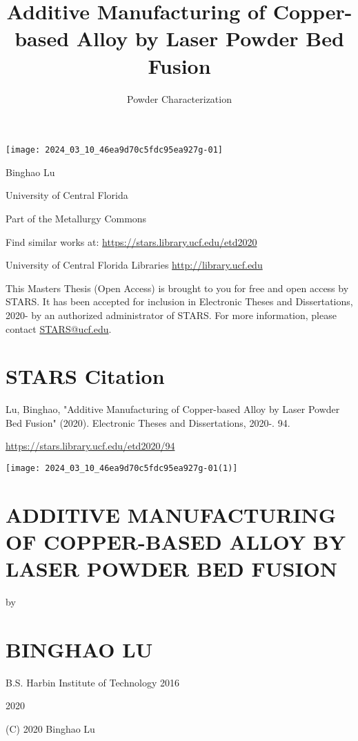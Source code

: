 \documentclass[10pt]{article}
\title{Additive Manufacturing of Copper-based Alloy by Laser Powder Bed Fusion }
\author{Powder Characterization}
\date{}
\begin{document}
\maketitle
\begin{center}
\texttt{[image: 2024\_03\_10\_46ea9d70c5fdc95ea927g-01]}
\end{center}

Binghao Lu

University of Central Florida

Part of the Metallurgy Commons

Find similar works at: \href{https://stars.library.ucf.edu/etd2020}{https://stars.library.ucf.edu/etd2020}

University of Central Florida Libraries \href{http://library.ucf.edu}{http://library.ucf.edu}

This Masters Thesis (Open Access) is brought to you for free and open access by STARS. It has been accepted for inclusion in Electronic Theses and Dissertations, 2020- by an authorized administrator of STARS. For more information, please contact \href{mailto:STARS@ucf.edu}{STARS@ucf.edu}.

\section*{STARS Citation}
Lu, Binghao, "Additive Manufacturing of Copper-based Alloy by Laser Powder Bed Fusion" (2020). Electronic Theses and Dissertations, 2020-. 94.

\href{https://stars.library.ucf.edu/etd2020/94}{https://stars.library.ucf.edu/etd2020/94}

\begin{center}
\texttt{[image: 2024\_03\_10\_46ea9d70c5fdc95ea927g-01(1)]}
\end{center}

\section*{ADDITIVE MANUFACTURING OF COPPER-BASED ALLOY BY LASER POWDER BED FUSION }
by

\section*{BINGHAO LU}
B.S. Harbin Institute of Technology 2016

2020

(C) 2020 Binghao Lu
\end{document}
